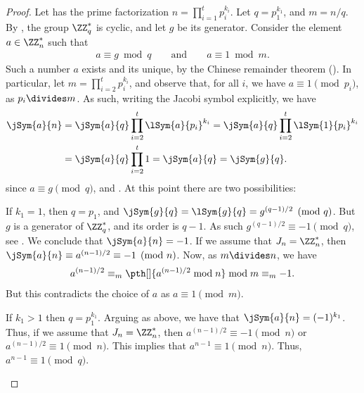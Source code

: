 \begin{proof}
    Let has the prime factorization $n = \prod_{i=1}^t p_i^{k_i}$.
    Let $q = p_1^{k_1}$, and $m = n/q$.  By
    , the group $\ZZ_q^*$ is cyclic,
    and let $g$ be its generator. Consider the element $a \in \ZZ_n^*$
    such that
    \begin{align*}
        a \equiv g \bmod{q}%
        \qquad%
        \text{and}%
        \qquad%
        a \equiv 1 \bmod{m}.
    \end{align*}
    Such a number $a$ exists and its unique, by the Chinese remainder
    theorem (). In particular, let $m =
    \prod_{i=2}^t p_i^{k_i}$, and observe that, for all $i$, we have
    $a \equiv 1 \pmod{p_i}$, as $p_i \divides m$. As such, writing the
    Jacobi symbol explicitly, we have 
    \begin{align*}
        \jSym{a}{n}%
        &=%
        \jSym{a}{q}\prod_{i=2}^t \lSym{a}{p_i}^{k_i}%
        =%
        \jSym{a}{q}\prod_{i=2}^t \lSym{1}{p_i}^{k_i}\\
        &=%
        \jSym{a}{q}\prod_{i=2}^t 1%
        =%
        \jSym{a}{q}%
        =%
        \jSym{g}{q}.
    \end{align*}
    since $a \equiv g \pmod{q}$, and 
    . At this point there are two possibilities:
    \begin{compactenumA}
        \item If $k_1=1$, then $q= p_1$, and $\jSym{g}{q} =
        \lSym{g}{q} = g^{(q-1)/2} \pmod q$.  But $g$ is a generator of
        $\ZZ_{q}^*$, and its order is $q-1$. As such $g^{(q-1)/2}
        \equiv -1 \pmod{q}$, see .  We conclude
        that $\jSym{a}{n} =-1$. If we assume that $J_n = \ZZ_n^*$,
        then $\jSym{a}{n} \equiv a^{(n-1)/2} \equiv -1 \pmod{n}$. Now,
        as $m \divides n$, we have
        \begin{align*}
            a^{(n-1)/2}%
            \equiv_m%
            \pth[]{ a^{(n-1)/2} \bmod{n}}%
            \bmod{m}%
            \equiv_m%
            -1.
        \end{align*}
        But this contradicts the choice of $a$ as $a \equiv 1
        \pmod{m}$.

        \item If $k_1 > 1$ then $q =p_1^{k_1}$.  Arguing as above, we
        have that $\jSym{a}{n} = (-1)^{k_1}$. Thus, if we assume that
        $J_n = \ZZ_n^*$, then $a^{(n-1)/2} \equiv - 1 \pmod{n}$ or
        $a^{(n-1)/2} \equiv 1 \pmod{n}$. This implies that $a^{n-1}
        \equiv 1 \pmod{n}$. Thus, $a^{n-1} \equiv
        1 \pmod{q}$.


\end{compactenumA}
\end{proof}
